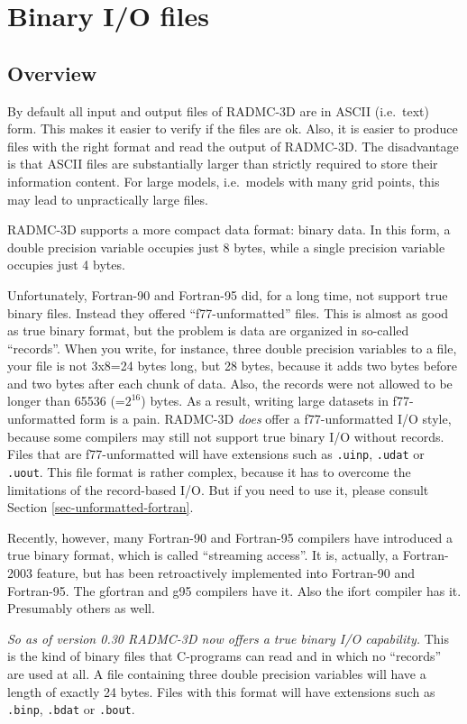 \documentclass{report}
\begin{document}
\chapter{Binary I/O files}
\label{chap-binary-io}
%
\section{Overview}
\label{sec-unformatted-overview}
By default all input and output files of RADMC-3D are in ASCII (i.e.\ text)
form. This makes it easier to verify if the files are ok. Also, it is easier
to produce files with the right format and read the output of RADMC-3D. The
disadvantage is that ASCII files are substantially larger than strictly
required to store their information content. For large models, i.e.\ models
with many grid points, this may lead to unpractically large files.

RADMC-3D supports a more compact data format: binary data. In this form, a
double precision variable occupies just 8 bytes, while a single precision
variable occupies just 4 bytes.

Unfortunately, Fortran-90 and Fortran-95 did, for a long time, not support
true binary files. Instead they offered ``f77-unformatted'' files. This is
almost as good as true binary format, but the problem is data are organized
in so-called ``records''. When you write, for instance, three double
precision variables to a file, your file is not 3x8=24 bytes long, but 28
bytes, because it adds two bytes before and two bytes after each chunk of
data. Also, the records were not allowed to be longer than 65536 (=$2^{16}$)
bytes. As a result, writing large datasets in f77-unformatted form is a
pain. RADMC-3D {\em does} offer a f77-unformatted I/O style, because some
compilers may still not support true binary I/O without records. Files that
are f77-unformatted will have extensions such as {\small\tt .uinp},
{\small\tt .udat} or {\small\tt .uout}. This file format is rather complex,
because it has to overcome the limitations of the record-based I/O. But if
you need to use it, please consult Section \ref{sec-unformatted-fortran}.

Recently, however, many Fortran-90 and Fortran-95 compilers have introduced
a true binary format, which is called ``streaming access''. It is, actually,
a Fortran-2003 feature, but has been retroactively implemented into
Fortran-90 and Fortran-95. The gfortran and g95 compilers have it. Also the
ifort compiler has it. Presumably others as well. 

{\em So as of version 0.30 RADMC-3D now offers a true binary I/O
  capability.}  This is the kind of binary files that C-programs can read
and in which no ``records'' are used at all. A file containing three double
precision variables will have a length of exactly 24 bytes. Files with this
format will have extensions such as {\small\tt .binp}, {\small\tt .bdat} or
{\small\tt .bout}.
\end{document}
